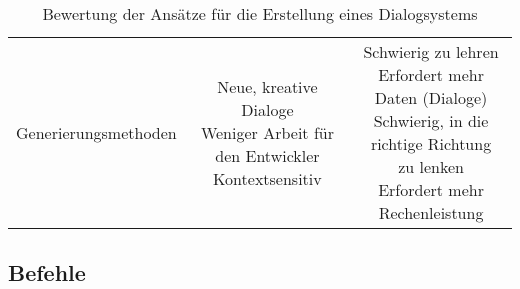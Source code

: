 \begin{table}[H]
\begin{tabular}{l|c|c}
        \hline
        Generierungsmethoden                & \makecell{Neue, kreative Dialoge \\ Weniger Arbeit für den Entwickler \\ Kontextsensitiv}           & \makecell{Schwierig zu lehren \\ Erfordert mehr Daten (Dialoge) \\ Schwierig, in die richtige Richtung \\ zu lenken \\Erfordert mehr Rechenleistung} \\
    \end{tabular}
    \caption{\label{table:Bewertungsmatrix_Konzepte_Dialogsysteme}Bewertung der Ansätze für die Erstellung eines Dialogsystems}
\end{table}
\noindent
\subsection{Befehle}

